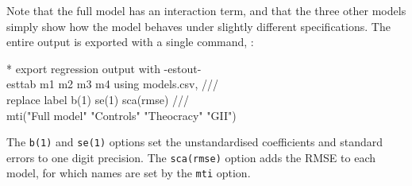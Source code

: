 Note that the full model has an interaction term, and that the three other models simply show how the model behaves under slightly different specifications. The entire output is exported with a single command, :

\begin{docspec}
  * export regression output with -estout-\\%
  esttab m1 m2 m3 m4 using models.csv, ///\\%
    replace label b(1) se(1) sca(rmse) ///\\%
  	mti("Full model" "Controls" "Theocracy" "GII")
\end{docspec}

The \texttt{b(1)} and \texttt{se(1)} options set the unstandardised coefficients and standard errors to one digit precision. The \texttt{sca(rmse)} option adds the RMSE to each model, for which names are set by the \texttt{mti} option.
